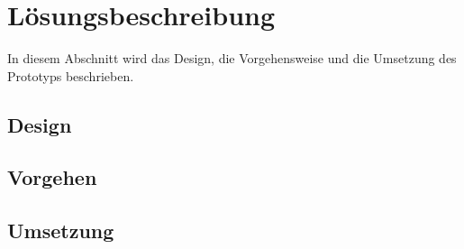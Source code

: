 \chapter{Lösungsbeschreibung}
\label{chapter:Loesungsbeschreibung}
In diesem Abschnitt wird das Design, die Vorgehensweise und die Umsetzung des Prototyps beschrieben.

\section{Design}
\label{section:Design}
\blindtext

\section{Vorgehen}
\blindtext

\section{Umsetzung}
\blindtext
